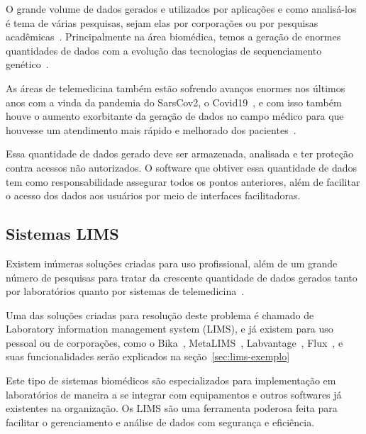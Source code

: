 
O grande volume de dados gerados e utilizados por aplicações e como analisá-los é tema de várias pesquisas, sejam elas por corporações ou por pesquisas acadêmicas~\cite{PhilipChen2014Data-intensiveData}. Principalmente na área biomédica, temos a geração de enormes quantidades de dados com a evolução das tecnologias de sequenciamento genético~\cite{luoJ2016}.

As áreas de telemedicina também estão sofrendo avanços enormes nos últimos anos com a vinda da pandemia do SarsCov2, o Covid19~\cite{bakhtiar2020, kronenfeld2021, GatesB.Colbert2020UtilityEra}, e com isso também houve o aumento exorbitante da geração de dados no campo médico para que houvesse um atendimento mais rápido e melhorado dos pacientes~\cite{MohdKhanapiAbdGhani2018PDFData, Coakley2015TransformingAnalytics}.

Essa quantidade de dados gerado deve ser armazenada, analisada e ter proteção contra acessos não autorizados. O software que obtiver essa quantidade de dados tem como responsabilidade assegurar todos os pontos anteriores, além de facilitar o acesso dos dados aos usuários por meio de interfaces facilitadoras.

\subsection{Sistemas LIMS}

Existem inúmeras soluções criadas para uso profissional, além de um grande número de pesquisas para tratar da crescente quantidade de dados gerados tanto por laboratórios quanto por sistemas de telemedicina~\cite{Mangrulkar2022AutomaticTechniques}.

Uma das soluções criadas para resolução deste problema é chamado de Laboratory information management system (LIMS), e já existem para uso pessoal ou de corporações, como o Bika~\cite{Goodblatt2006FosteringProcess}, MetaLIMS~\cite{Heinle2017MetaLIMSLabs}, Labvantage~\cite{Smallmon2017BiobankingSilos}, Flux~\cite{Melo2010SIGLa:Laboratories}, e suas funcionalidades serão explicados na seção~\ref{sec:lims-exemplo}

Este tipo de sistemas biomédicos são especializados para implementação em laboratórios de maneira a se integrar com equipamentos e outros softwares já existentes na organização.
Os LIMS são uma ferramenta poderosa feita para facilitar o gerenciamento e análise de dados com segurança e eficiência.



